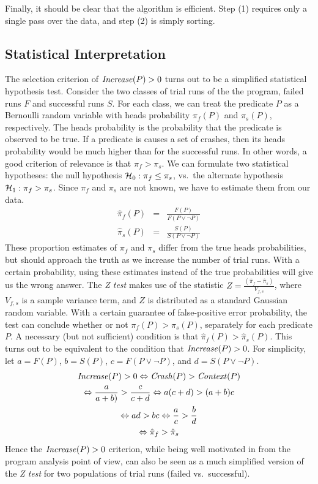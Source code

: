 Finally, it should be clear that the algorithm is efficient.
Step (1) requires only a single pass over the data, and step (2) is
simply sorting.

\subsection{Statistical Interpretation}

The selection criterion of $\mbox{\textit{Increase}}(P) > 0$ turns out to be a simplified
statistical hypothesis test.  Consider the two classes of trial runs
of the the program, failed runs $F$ and successful runs $S$.  For each
class, we can treat the predicate $P$ as a Bernoulli random variable
with heads probability $\pi_f(P)$ and $\pi_s(P)$, respectively.  The heads
probability is the probability that the predicate is observed to be
true.  If a predicate is causes a set of crashes, then its heads
probability would be much higher than for the successful runs.  In
other words, a good criterion of relevance is that $\pi_f > \pi_s$.  We
can formulate two statistical hypotheses: the null hypothesis ${\mathcal{H}}_0:
\pi_f \leq \pi_s$, vs.\ the alternate hypothesis ${\mathcal{H}}_1: \pi_f > \pi_s$.  Since
$\pi_f$ and $\pi_s$ are not known, we have to estimate them from our
data.
\begin{eqnarray}
  \hat \pi_f(P) &=& \frac{F(P)}{F(P \lor \lnot P)} \\
  \hat \pi_s(P) &=& \frac{S(P)}{S(P \lor \lnot P)}
\end{eqnarray}
These proportion estimates of $\pi_f$ and $\pi_s$ differ from the true
heads probabilities, but should approach the truth as we increase the
number of trial runs.  With a certain probability, using these
estimates instead of the true probabilities will give us the wrong
answer.  The \textit{Z test} makes use of the statistic $ Z =
\frac{(\hat \pi_f - \hat \pi_s)}{V_{f,s}}$, where $V_{f,s}$ is a sample
variance term, and $Z$ is distributed as a standard Gaussian random
variable.  With a certain guarantee of false-positive error
probability, the test can conclude whether or not $\pi_f(P) > \pi_s(P)$,
separately for each predicate $P$.  A necessary (but not sufficient)
condition is that $\hat \pi_f(P) > \hat \pi_s(P)$.  This turns out to be
equivalent to the condition that $\mbox{\textit{Increase}}(P) > 0$.  For simplicity,
let $a = F(P)$, $b = S(P)$, $c = F(P\lor\lnot P)$, and $d = S(P\lor\lnot P)$.
\begin{gather*}
  \mbox{\textit{Increase}}(P) > 0 \Leftrightarrow \mbox{\textit{Crash}}(P) > \mbox{\textit{Context}}(P) \\
  \Leftrightarrow \frac{a}{a+b)} > \frac{c}{c+d}
  \Leftrightarrow a (c+d) > (a+b) c \\
  \Leftrightarrow ad > bc \Leftrightarrow \frac{a}{c} > \frac{b}{d} \\
  \Leftrightarrow \hat \pi_f > \hat \pi_s
\end{gather*}
Hence the $\mbox{\textit{Increase}}(P) > 0$ criterion, while being well motivated in
from the program analysis point of view, can also be seen as a much
simplified version of the \textit{Z test} for two populations of trial
runs (failed vs.\ successful).


